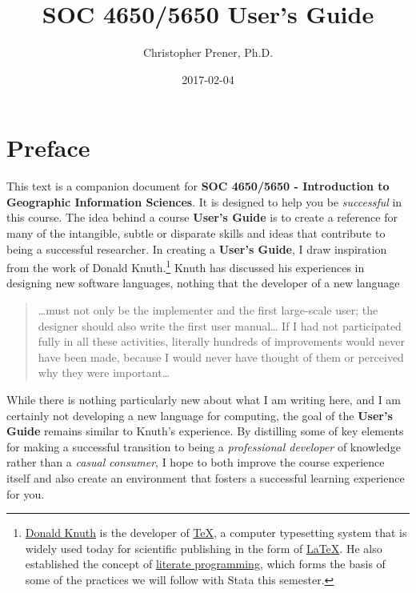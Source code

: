 \documentclass[]{book}
\title{SOC 4650/5650 User's Guide}
\author{Christopher Prener, Ph.D.}
\date{2017-02-04}
\let\rmarkdownfootnote\footnote%
\def\footnote{\protect\rmarkdownfootnote}
\begin{document}
\maketitle

{
\setcounter{tocdepth}{1}
\tableofcontents
}
\chapter*{Preface}\label{preface}

This text is a companion document for \textbf{SOC 4650/5650 -
Introduction to Geographic Information Sciences}. It is designed to help
you be \emph{successful} in this course. The idea behind a course
\textbf{User's Guide} is to create a reference for many of the
intangible, subtle or disparate skills and ideas that contribute to
being a successful researcher. In creating a \textbf{User's Guide}, I
draw inspiration from the work of Donald Knuth.\footnote{\href{https://en.wikipedia.org/wiki/Donald_Knuth}{Donald
  Knuth} is the developer of
  \href{https://en.wikipedia.org/wiki/TeX}{TeX}, a computer typesetting
  system that is widely used today for scientific publishing in the form
  of \href{https://en.wikipedia.org/wiki/LaTeX}{LaTeX}. He also
  established the concept of
  \href{https://en.wikipedia.org/wiki/Literate_programming}{literate
  programming}, which forms the basis of some of the practices we will
  follow with Stata this semester.} Knuth has discussed his experiences
in designing new software languages, nothing that the developer of a new
language

\begin{quote}
\ldots{}must not only be the implementer and the first large-scale user;
the designer should also write the first user manual\ldots{} If I had
not participated fully in all these activities, literally hundreds of
improvements would never have been made, because I would never have
thought of them or perceived why they were important\ldots{}
\end{quote}

While there is nothing particularly new about what I am writing here,
and I am certainly not developing a new language for computing, the goal
of the \textbf{User's Guide} remains similar to Knuth's experience. By
distilling some of key elements for making a successful transition to
being a \emph{professional developer} of knowledge rather than a
\emph{casual consumer}, I hope to both improve the course experience
itself and also create an environment that fosters a successful learning
experience for you.
\end{document}
